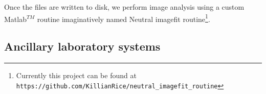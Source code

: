 Once the files are written to disk, we perform image analysis using a custom Matlab$^{TM}$ routine imaginatively named Neutral imagefit routine\footnote{Currently this project can be found at \texttt{https://github.com/KillianRice/neutral\_imagefit\_routine}}.

\subsection{Ancillary laboratory systems} \label{ssec:misc_sys}
%

